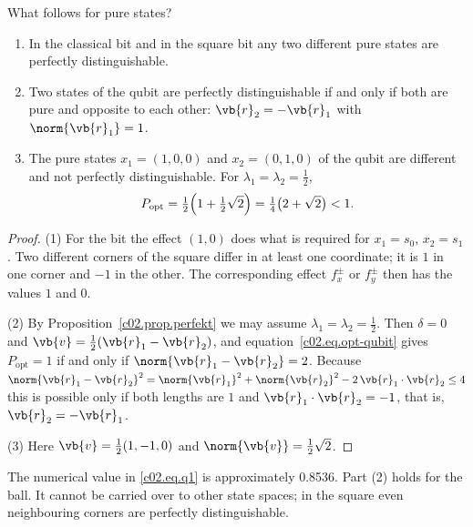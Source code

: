 What follows for pure states?

\begin{corollary}\label{c02.cor.rein}
  \begin{enumerate}
    \item In the classical bit and in the square bit any two different pure states are
      perfectly distinguishable.
    \item Two states of the qubit are perfectly distinguishable if and only if both are
      pure and opposite to each other: $\vb{r}_2 = -\vb{r}_1$ with $\norm{\vb{r}_1} = 1$.
    \item The pure states $x_1 = (1,0,0)$ and $x_2 = (0,1,0)$ of the qubit are different
      and not perfectly distinguishable. For $\lambda_1 = \lambda_2 = \tfrac12$,
      \begin{equation}\label{c02.eq.q1}
        P_{\mathrm{opt}} = \tfrac12\Bigl(1 + \tfrac12\sqrt{2}\Bigr) = \tfrac14\bigl(2 + \sqrt{2}\bigr) < 1 .
      \end{equation}
  \end{enumerate}
\end{corollary}
\begin{proof}
  (1) For the bit the effect $(1,0)$ does what is required for $x_1 = s_0$, $x_2 = s_1$.
  Two different corners of the square differ in at least one coordinate; it is $1$ in one
  corner and $-1$ in the other. The corresponding effect $f_x^{\pm}$ or $f_y^{\pm}$ then
  has the values $1$ and $0$.

  (2) By Proposition~\ref{c02.prop.perfekt} we may assume
  $\lambda_1 = \lambda_2 = \tfrac12$. Then $\delta = 0$ and
  $\vb{v} = \tfrac12(\vb{r}_1 - \vb{r}_2)$, and equation~\eqref{c02.eq.opt-qubit} gives
  $P_{\mathrm{opt}} = 1$ if and only if $\norm{\vb{r}_1 - \vb{r}_2} = 2$. Because
  $\norm{\vb{r}_1 - \vb{r}_2}^2 = \norm{\vb{r}_1}^2 + \norm{\vb{r}_2}^2 - 2\,\vb{r}_1\cdot\vb{r}_2 \leq 4$
  this is possible only if both lengths are $1$ and $\vb{r}_1\cdot\vb{r}_2 = -1$, that is,
  $\vb{r}_2 = -\vb{r}_1$.

  (3) Here $\vb{v} = \tfrac12(1, -1, 0)$ and $\norm{\vb{v}} = \tfrac12\sqrt{2}$.
\end{proof}

The numerical value in \eqref{c02.eq.q1} is approximately \num[c02.cl.level-q1]{0.8536}{}.
Part (2) holds for the ball. It cannot be carried over to other state spaces; in the square
even neighbouring corners are perfectly distinguishable.

